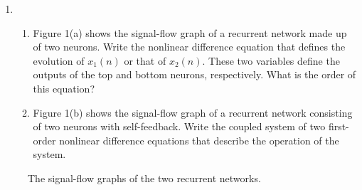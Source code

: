 \documentclass[10pt]{article}
\begin{document}
\begin{enumerate}
\item 
\begin{enumerate} \item Figure 1(a) shows the
signal-flow graph of a recurrent network made up of two neurons. Write
the nonlinear difference equation that defines the evolution of $x_1(n)$
or that of $x_2(n)$. These two variables define the outputs of the top 
and bottom neurons, respectively. What is the order of this equation? 
\item Figure 1(b) shows the signal-flow graph of a recurrent network
consisting of two neurons with self-feedback. Write the coupled system 
of two first-order nonlinear difference equations that describe the
operation of the system.
\end{enumerate}
\end{enumerate}

\begin{figure}[h] 
\centering
{}
\caption{The signal-flow graphs of the two recurrent networks.}
\label{fig:ex4ab}
\end{figure}
\end{document}
